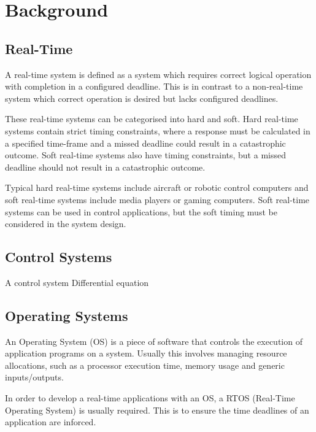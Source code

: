 \chapter{Background}

\section{Real-Time}
A real-time system is defined as a system which requires correct logical operation with completion in a configured deadline. This is in contrast to a non-real-time system which correct operation is desired but lacks configured deadlines. \cite{kaviRealTimeSystems2009}

These real-time systems can be categorised into hard and soft. Hard real-time systems contain strict timing constraints, where a response must be calculated in a specified time-frame and a missed deadline could result in a catastrophic outcome. Soft real-time systems also have timing constraints, but a missed deadline should not result in a catastrophic outcome.



Typical hard real-time systems include aircraft or robotic control computers and soft real-time systems include media players or gaming computers. Soft real-time systems can be used in control applications, but the soft timing must be considered in the system design.

\section{Control Systems}
A control system
Differential equation


\section{Operating Systems}
An Operating System (OS) is a piece of software that controls the execution of application programs on a system. Usually this involves managing resource allocations, such as a processor execution time, memory usage and generic inputs/outputs. \cite{stallings2018operating}

In order to develop a real-time applications with an OS, a RTOS (Real-Time Operating System) is usually required. This is to ensure the time deadlines of an application are inforced.

